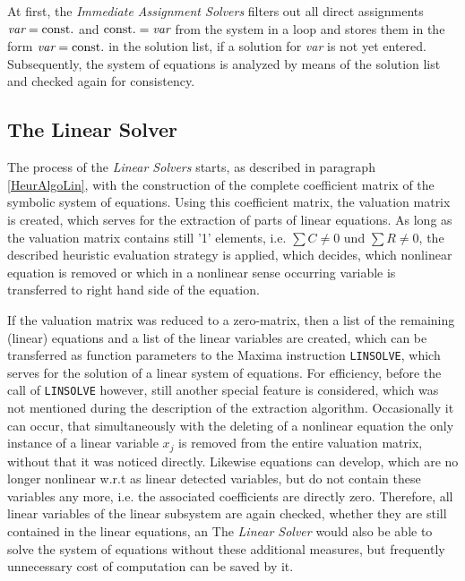 At first, the {\em Immediate Assignment Solvers }  filters out all direct assignments  $\mbox{\em var} = \mbox{const.}$ and $\mbox{const.} = \mbox{\em var}$ from the system  in a loop and stores them in the form $\mbox{\em var} = \mbox{const.}$ in the solution list, if a solution for {\em var}  is not yet entered. Subsequently, the system of equations is analyzed by means of the solution list  and checked again for consistency.

\clearpage

\subsection{The Linear Solver}%

The process of the {\em Linear Solvers} starts, as described in paragraph \ref{HeurAlgoLin}, with the construction of the complete coefficient matrix of the symbolic system of equations. Using this coefficient matrix, the valuation matrix is created, which serves for the extraction of  parts of linear equations. As long as the valuation matrix contains still '1' elements, i.e. $\sum C \neq 0$ und $\sum R \neq 0$, the described heuristic evaluation strategy  is applied, which decides, which nonlinear equation is removed or which in a nonlinear sense occurring variable is transferred to right hand side of the equation.

If the valuation matrix was reduced to a zero-matrix, then a list of the remaining (linear) equations and a list of the linear variables are created, which can be transferred as function parameters to the Maxima instruction \verb+LINSOLVE+, which  serves for the solution of a linear system of equations. 
For efficiency,  before the call of \verb+LINSOLVE+ however, still another special feature is considered, which was not mentioned during the description of the extraction algorithm. Occasionally it can occur, that simultaneously with the deleting of a nonlinear equation the only instance of a linear variable $x_j$ is removed  from the entire valuation matrix, without that it was noticed directly. 
Likewise equations can develop, which are no longer nonlinear w.r.t as linear detected variables, but do not contain these variables any more, i.e. the associated coefficients are directly zero. 
Therefore,  all linear variables of the linear subsystem are  again checked, whether they are still contained in the linear equations, an
The {\em Linear Solver}
would also be able to solve the system of equations without these additional measures, but frequently unnecessary cost of computation can be saved by it.

